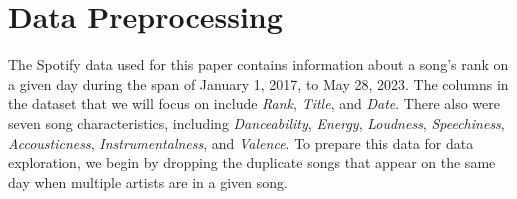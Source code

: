 \documentclass{article}
\begin{document}

\section{Data Preprocessing}
The Spotify data used for this paper contains information about a song’s rank on a given day during the span of January 1, 2017, to May 28, 2023. The columns in the dataset that we will focus on include \textit{Rank}, \textit{Title}, and \textit{Date}. There also were seven song characteristics, including \textit{Danceability}, \textit{Energy}, \textit{Loudness}, \textit{Speechiness}, \textit{Accousticness}, \textit{Instrumentalness}, and \textit{Valence}. To prepare this data for data exploration, we begin by dropping the duplicate songs that appear on the same day when multiple artists are in a given song. 
\end{document}
